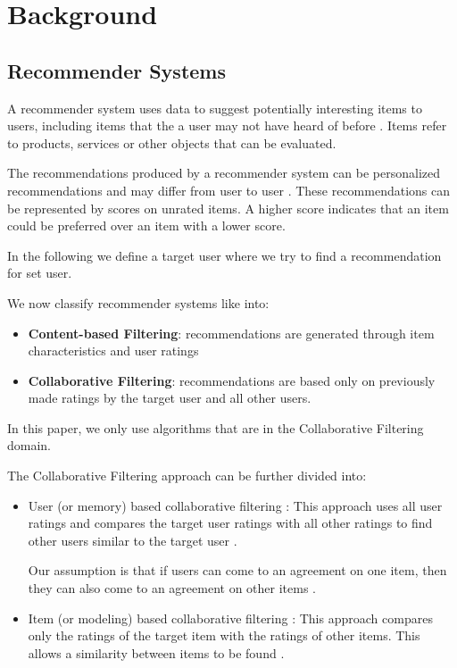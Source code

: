 \chapter{Background}

\section{Recommender Systems}

A recommender system uses data to suggest potentially interesting items to users, including items that the a user may not have heard of before \cite{LU20121}. Items refer to products, services or other objects that can be evaluated. 

The recommendations produced by a recommender system can be personalized recommendations and may differ from user to user \cite{LU20121}. These recommendations can be represented by scores on unrated items. A higher score indicates that an item could be preferred over an item with a lower score.

In the following we define a target user where we try to find a recommendation for set user.

We now classify recommender systems like \cite{LU20121, itemColFiltRecom} into:

\begin{itemize}
    \item \textbf{Content-based Filtering}: recommendations are generated through item characteristics and user ratings
    \item \textbf{Collaborative Filtering}: recommendations are based only on previously made ratings by the target user and all other users. 
\end{itemize}

In this paper, we only use algorithms that are in the Collaborative Filtering domain. 

The Collaborative Filtering approach can be further divided into:

\begin{itemize}
    \item User (or memory) based collaborative filtering \cite{itemColFiltRecom, LU20121}: This approach uses all user ratings and compares the target user ratings with all other ratings to find other users similar to the target user \cite{itemColFiltRecom}. 

Our assumption is that if users can come to an agreement on one item, then they can also come to an agreement on other items \cite{LU20121}.
    

    
    \item Item (or modeling) based collaborative filtering \cite{itemColFiltRecom, LU20121}: This approach compares only the ratings of the target item with the ratings of other items. This allows a similarity between items to be found \cite{itemColFiltRecom}.
\end{itemize}

